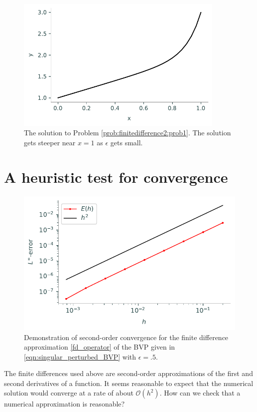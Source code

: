 \begin{figure}[h]
\centering
\includegraphics[width=10cm]{figures/figure2.pdf}
\caption{The solution to Problem \ref{prob:finitedifference2:prob1}.
The solution gets steeper near $x = 1$ as $\epsilon $ gets small.}
\end{figure}


\section*{A heuristic test for convergence}
\begin{figure}[ht]
\centering
\includegraphics[width=12cm]{figures/example_convergence.pdf}
\caption{Demonstration of second-order convergence for the finite difference approximation \eqref{fd_operator} of the BVP given in \eqref{eqn:singular_perturbed_BVP} with $\epsilon = .5$. } \label{fig:finitedifference2}
\end{figure}

The finite differences used above are second-order approximations of the first and second derivatives of a function.
It seems reasonable to expect that the numerical solution would converge at a rate of about $\mathcal{O}(h^2)$.
How can we check that a numerical approximation is reasonable?

